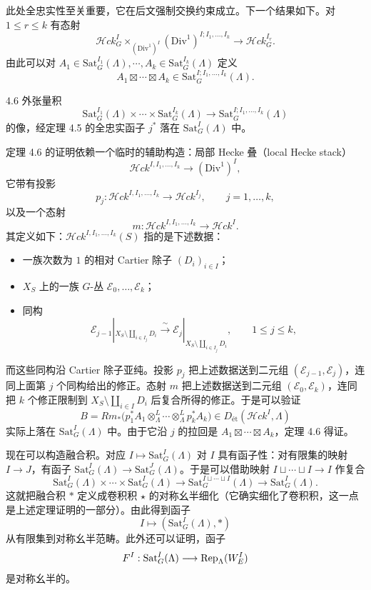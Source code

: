 此处全忠实性至关重要，它在后文强制交换约束成立。下一个结果如下。对 $1\le r\le k$ 有态射
\[
\mathcal{H}ck^{I}_{G}\times_{(\mathrm{Div}^{1})^{I}}(\mathrm{Div}^{1})^{I;I_{1},\dots,I_{k}}\longrightarrow\mathcal{H}ck^{I_{r}}_{G}.
\]
由此可以对 $A_{1}\in\mathrm{Sat}^{I_{1}}_{G}(\Lambda),\cdots,A_{k}\in\mathrm{Sat}^{I_{k}}_{G}(\Lambda)$ 定义
\[
A_{1}\boxtimes\cdots\boxtimes A_{k}\in\mathrm{Sat}^{I;I_{1},\dots,I_{k}}_{G}(\Lambda).
\]

\begin{thm}{4.6}
外张量积
\[
\mathrm{Sat}^{I_{1}}_{G}(\Lambda)\times\cdots\times\mathrm{Sat}^{I_{k}}_{G}(\Lambda)\longrightarrow\mathrm{Sat}^{I;I_{1},\dots,I_{k}}_{G}(\Lambda)
\]
的像，经定理 4.5 的全忠实函子 $j^{*}$ 落在 $\mathrm{Sat}^{I}_{G}(\Lambda)$ 中。
\label{thm:a3-4-6}
\end{thm}

定理 4.6 的证明依赖一个临时的辅助构造：局部 Hecke 叠（local Hecke stack）
\[
\mathcal{H}ck^{I,I_{1},\dots,I_{k}}\longrightarrow(\mathrm{Div}^{1})^{I},
\]
它带有投影
\[
p_{j}:\mathcal{H}ck^{I,I_{1},\dots,I_{k}}\longrightarrow\mathcal{H}ck^{I_{j}},\qquad j=1,\dots,k,
\]
以及一个态射
\[
m:\mathcal{H}ck^{I,I_{1},\dots,I_{k}}\longrightarrow\mathcal{H}ck^{I}.
\]
其定义如下：$\mathcal{H}ck^{I,I_{1},\dots,I_{k}}(S)$ 指的是下述数据：
\begin{itemize}
\item 一族次数为 $1$ 的相对 Cartier 除子 $(D_{i})_{i\in I}$；
\item $X_{S}$ 上的一族 $G$-丛 $\mathcal{E}_{0},\dots,\mathcal{E}_{k}$；
\item 同构
\[
\mathcal{E}_{j-1}|_{X_{S}\setminus\coprod_{i\in I_{j}}D_{i}}\xrightarrow{\ \sim\ }\mathcal{E}_{j}|_{X_{S}\setminus\coprod_{i\in I_{j}}D_{i}},\qquad 1\le j\le k,
\]
\end{itemize}
而这些同构沿 Cartier 除子亚纯。投影 $p_{j}$ 把上述数据送到二元组 $(\mathcal{E}_{j-1},\mathcal{E}_{j})$，连同上面第 $j$ 个同构给出的修正。态射 $m$ 把上述数据送到二元组 $(\mathcal{E}_{0},\mathcal{E}_{k})$，连同把 $k$ 个修正限制到 $X_{S}\setminus\coprod_{i\in I}D_{i}$ 后复合所得的修正。于是可以验证
\[
B=Rm_{*}\bigl(p_{1}^{*}A_{1}\otimes^{L}_{\Lambda}\cdots\otimes^{L}_{\Lambda}p_{k}^{*}A_{k}\bigr)\in D_{\mathrm{ét}}(\mathcal{H}ck^{I},\Lambda)
\]
实际上落在 $\mathrm{Sat}^{I}_{G}(\Lambda)$ 中。由于它沿 $j$ 的拉回是 $A_{1}\boxtimes\cdots\boxtimes A_{k}$，定理 4.6 得证。

现在可以构造融合积。对应 $I\mapsto\mathrm{Sat}^{I}_{G}(\Lambda)$ 对 $I$ 具有函子性：对有限集的映射 $I\to J$，有函子 $\mathrm{Sat}^{I}_{G}(\Lambda)\to\mathrm{Sat}^{J}_{G}(\Lambda)$。于是可以借助映射 $I\sqcup\cdots\sqcup I\to I$ 作复合
\[
\mathrm{Sat}^{I}_{G}(\Lambda)\times\cdots\times\mathrm{Sat}^{I}_{G}(\Lambda)\longrightarrow\mathrm{Sat}^{I\sqcup\cdots\sqcup I}_{G}(\Lambda)\longrightarrow\mathrm{Sat}^{I}_{G}(\Lambda).
\]
这就把融合积 $\ast$ 定义成卷积积 $\star$ 的对称幺半细化（它确实细化了卷积积，这一点是上述定理证明的一部分）。由此得到函子
\[
I\longmapsto(\mathrm{Sat}^{I}_{G}(\Lambda),\ast)
\]
从有限集到对称幺半范畴。此外还可以证明，函子
\[
F^{I}:\mathrm{Sat}^{I}_{G}(\Lambda)\longrightarrow\operatorname{Rep}_{\Lambda}(W^{I}_{E})
\]
是对称幺半的。

